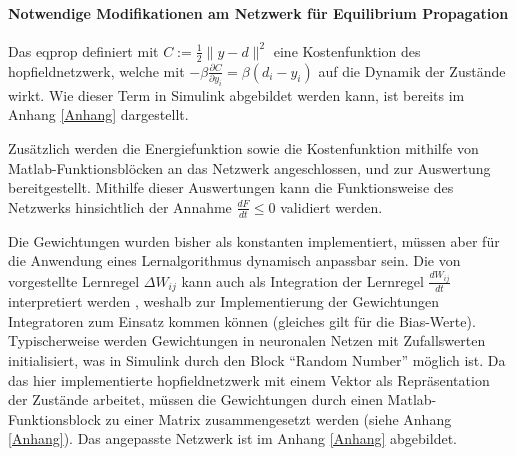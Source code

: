 \paragraph{Notwendige Modifikationen am Netzwerk für Equilibrium Propagation}

Das \gls{eqprop} definiert mit \(C:=\frac{1}{2}\| y-d\| ^2\) eine Kostenfunktion des \gls{hopfieldnetzwerk}, welche mit \(-\beta\frac{\partial C}{\partial y_i}=\beta(d_i-y_i)\) auf die Dynamik der Zustände wirkt. Wie dieser Term in Simulink abgebildet werden kann, ist bereits im Anhang \ref{Anhang} dargestellt.

Zusätzlich werden die Energiefunktion sowie die Kostenfunktion mithilfe von Matlab-Funktionsblöcken an das Netzwerk angeschlossen, und zur Auswertung bereitgestellt. Mithilfe dieser Auswertungen kann die Funktionsweise des Netzwerks hinsichtlich der Annahme \(\frac{dF}{dt}\leq{0}\) \cite[vgl. S. 3]{Scellier2017} validiert werden.

Die Gewichtungen wurden bisher als konstanten implementiert, müssen aber für die Anwendung eines Lernalgorithmus dynamisch anpassbar sein. Die von \citeauthor{Scellier2017} vorgestellte Lernregel \(\Delta W_{ij}\) kann auch als Integration der Lernregel \(\frac{dW_{ij}}{dt}\) interpretiert werden \cite[vgl. S. 5]{Scellier2017}, weshalb zur Implementierung der Gewichtungen Integratoren zum Einsatz kommen können (gleiches gilt für die Bias-Werte). Typischerweise werden Gewichtungen in neuronalen Netzen mit Zufallswerten initialisiert, was in Simulink durch den Block "`Random Number"' möglich ist. Da das hier implementierte \gls{hopfieldnetzwerk} mit einem Vektor als Repräsentation der Zustände arbeitet, müssen die Gewichtungen durch einen Matlab-Funktionsblock zu einer Matrix zusammengesetzt werden (siehe Anhang \ref{Anhang}). Das angepasste Netzwerk ist im Anhang \ref{Anhang} abgebildet.
